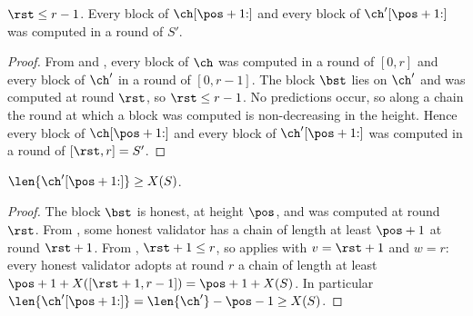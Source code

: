 \begin{lemma}\label{lem.rounds}
    $\rst\le r-1$. Every block of $\ch[\pos+1{:}]$ and every block of
    $\ch'[\pos+1{:}]$ was computed in a round of $S'$.
\end{lemma}
\begin{proof}
    From  and , every block of $\ch$ was
    computed in a round of $[0,r]$ and every block of $\ch'$ in a round of
    $[0,r-1]$. The block $\bst$ lies on $\ch'$ and was computed at round
    $\rst$, so $\rst\le r-1$. No predictions occur, so along a chain the round
    at which a block was computed is non-decreasing in the height. Hence every
    block of $\ch[\pos+1{:}]$ and every block of $\ch'[\pos+1{:}]$ was computed
    in a round of $[\rst,r]=S'$.
\end{proof}

\begin{lemma}\label{lem.honestlen}
    $\len{\ch'[\pos+1{:}]}\ge X(S)$.
\end{lemma}
\begin{proof}
    The block $\bst$ is honest, at height $\pos$, and was computed at round
    $\rst$. From
    , some honest validator has a chain of length at least
    $\pos+1$ at round $\rst+1$. From , $\rst+1\le r$, so
     applies with $v=\rst+1$ and $w=r$: every honest validator
    adopts at round $r$ a chain of length at least
    $\pos+1+X([\rst+1,r-1])=\pos+1+X(S)$. In particular
    $\len{\ch'[\pos+1{:}]}=\len{\ch'}-\pos-1\ge X(S)$.
\end{proof}

